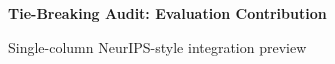 \documentclass[10pt]{article}
\begin{document}
\ifdefined\goshaSingleColumn
 {\centering\large\bfseries Tie-Breaking Audit: Evaluation Contribution\par}
 {\centering\small Single-column NeurIPS-style integration preview\par}
 \vspace{0.8em}
\else
\fi
\raggedbottom



\end{document}
